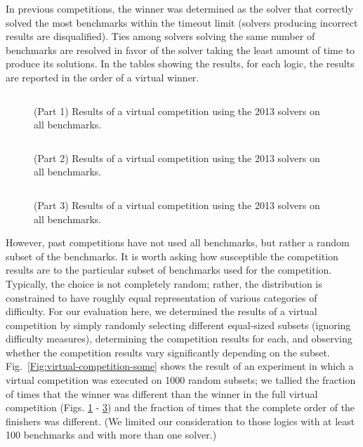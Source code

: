 \documentclass{eptcs}
\begin{document}
In previous competitions, the winner was determined as the solver that correctly solved the most benchmarks within the timeout limit (solvers producing incorrect results are disqualified). Ties among solvers solving the same number of benchmarks are resolved in favor of the solver taking the least amount of time to produce its solutions. In the tables showing the results, for each logic, the results are reported in the order of a virtual winner.

\begin{figure}
\centering
\begin{tabular}{|p{.01in}rrl|}
\hline

\end{tabular}
\caption{(Part 1) Results of a virtual competition using the 2013 solvers on all benchmarks.}
\label{Fig:virtual-competition-all}
\end{figure}

\begin{figure}
\centering
\begin{tabular}{|p{.01in}rrl|}
\hline

\end{tabular}
\caption{(Part 2) Results of a virtual competition using the 2013 solvers on all benchmarks.}
\label{Fig:virtual-competition-all2}
\end{figure}

\begin{figure}
\centering
\begin{tabular}{|p{.1in}rrl|}
\hline

\end{tabular}
\caption{(Part 3) Results of a virtual competition using the 2013 solvers on all benchmarks.}
\label{Fig:virtual-competition-all3}
\end{figure}

However, past competitions have not used all benchmarks, but rather a random subset of the benchmarks. It is worth asking how susceptible the competition results are to the particular subset of benchmarks used for the competition. Typically, the choice is not completely random; rather, the distribution is constrained to have roughly equal representation of various categories of difficulty. For our evaluation here, we determined the results of a virtual competition by simply randomly selecting different equal-sized subsets (ignoring difficulty measures), determining the competition results for each, and observing whether the competition results vary significantly depending on the subset.  Fig.~\ref{Fig:virtual-competition-some} shows the result of an experiment in which a virtual competition was executed on 1000 random subsets; we tallied the fraction of times that the winner was different than the winner in the full virtual competition (Figs. \ref{Fig:virtual-competition-all} - \ref{Fig:virtual-competition-all3}) and the fraction of times that the complete order of the finishers was different. (We limited our consideration to those logics with at least 100 benchmarks and with more than one solver.)
\end{document}
